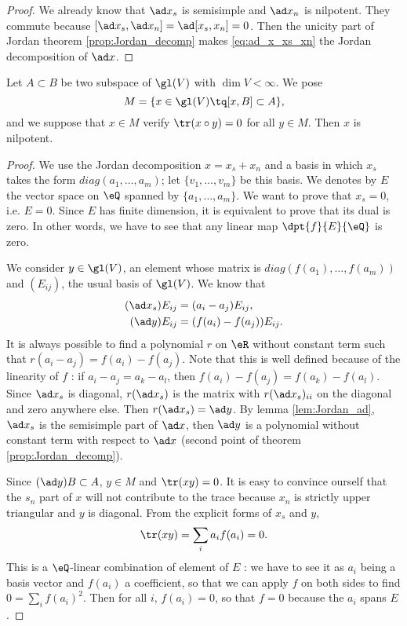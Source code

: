 \begin{proof}
We already know that $\ad x_s$ is semisimple and $\ad x_n$ is nilpotent. They commute because $[\ad x_s,\ad x_n]=\ad[x_s,x_n]=0$. Then the unicity part of Jordan theorem \ref{prop:Jordan_decomp} makes \eqref{eq:ad_x_xs_xn} the Jordan decomposition of $\ad x$.
\end{proof}

\begin{lemma}\label{lem:M_nil}
Let $A\subset B$ be two subspace of $\gl(V)$ with $\dim V<\infty$. We pose 
\[
   M=\{x\in\gl(V)\tq [x,B]\subset A\},
\]
and we suppose that $x\in M$ verify $\tr(x\circ y)=0$ for all $y\in M$. Then $x$ is nilpotent.
\end{lemma}

\begin{proof}
We use the Jordan decomposition $x=x_s+x_n$ and a basis in which $x_s$ takes the form $diag(a_1,\ldots,a_m)$; let $\{v_1,\ldots,v_m\}$ be this basis. We denotes by $E$ the vector space on $\eQ$ spanned by $\{a_1,\ldots,a_m\}$. We want to prove that $x_s=0$, i.e. $E=0$. Since $E$ has finite dimension, it is equivalent to prove that its dual is zero. In other words, we have to see that any linear map $\dpt{f}{E}{\eQ}$ is zero.

We consider $y\in\gl(V)$, an element whose matrix is $diag(f(a_1),\ldots,f(a_m))$ and $(E_{ij})$, the usual basis of $\gl(V)$. We know that 
\begin{subequations}
\begin{align}
  (\ad x_s)E_{ij}&=(a_i-a_j)E_{ij},\\
  (\ad y)E_{ij}&=(f(a_i)-f(a_j))E_{ij}.
\end{align}
\end{subequations}
It is always possible to find a polynomial $r$ on $\eR$ without constant term such that $r(a_i-a_j)=f(a_i)-f(a_j)$. Note that this is well defined because of the linearity of $f$ : if $a_i-a_j=a_k-a_l$, then $f(a_i)-f(a_j)=f(a_k)-f(a_l)$. Since $\ad x_s$ is diagonal, $r(\ad x_s)$ is the matrix with $r(\ad x_s)_{ii}$ on the diagonal and zero anywhere else. Then $r(\ad x_s)=\ad y$. By lemma \ref{lem:Jordan_ad}, $\ad x_s$ is the semisimple part of $\ad x$, then $\ad y$ is  a polynomial without constant term with respect to $\ad x$ (second point of theorem \ref{prop:Jordan_decomp}).

Since $(\ad y)B\subset A$, $y\in M$ and $\tr(xy)=0$. It is easy to convince ourself that the $s_n$ part of $x$ will not contribute to the trace because $x_n$ is strictly upper triangular and $y$ is diagonal. From the explicit forms of $x_s$ and $y$,
\[
  \tr(xy)=\sum_ia_if(a_i)=0.
\]
This is a $\eQ$-linear combination of element of $E$ : we have to see it as $a_i$ being a basis vector and $f(a_i)$ a coefficient, so that we can apply $f$ on both sides to find $0=\sum_if(a_i)^2$. Then for all $i$, $f(a_i)=0$, so that $f=0$ because  the $a_i$ spans $E$.
\end{proof}

